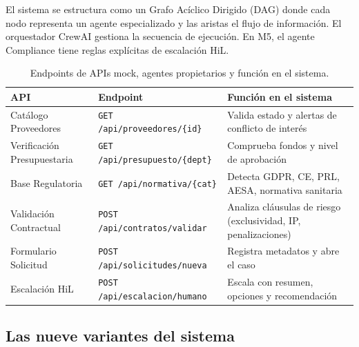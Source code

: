 \documentclass[preprint,12pt,authoryear]{elsarticle}
\begin{document}
El sistema se estructura como un Grafo Ac\'iclico Dirigido (DAG) donde cada
nodo representa un agente especializado y las aristas el flujo de informaci\'on.
El orquestador CrewAI gestiona la secuencia de ejecuci\'on.
En M5, el agente Compliance tiene reglas expl\'icitas de escalaci\'on HiL.

\begin{table}[htbp]
\centering
\caption{Endpoints de APIs mock, agentes propietarios y funci\'on en el sistema.}
\label{tab:apis}
\begin{tabularx}{\textwidth}{llX}
\toprule
\textbf{API} & \textbf{Endpoint} & \textbf{Funci\'on en el sistema} \\
\midrule
Cat\'alogo Proveedores &
  \texttt{GET /api/proveedores/\{id\}} &
  Valida estado y alertas de conflicto de inter\'es \\
Verificaci\'on Presupuestaria &
  \texttt{GET /api/presupuesto/\{dept\}} &
  Comprueba fondos y nivel de aprobaci\'on \\
Base Regulatoria &
  \texttt{GET /api/normativa/\{cat\}} &
  Detecta GDPR, CE, PRL, AESA, normativa sanitaria \\
Validaci\'on Contractual &
  \texttt{POST /api/contratos/validar} &
  Analiza cl\'ausulas de riesgo (exclusividad, IP, penalizaciones) \\
Formulario Solicitud &
  \texttt{POST /api/solicitudes/nueva} &
  Registra metadatos y abre el caso \\
Escalaci\'on HiL &
  \texttt{POST /api/escalacion/humano} &
  Escala con resumen, opciones y recomendaci\'on \\
\bottomrule
\end{tabularx}
\end{table}

\subsection{Las nueve variantes del sistema}
\end{document}
